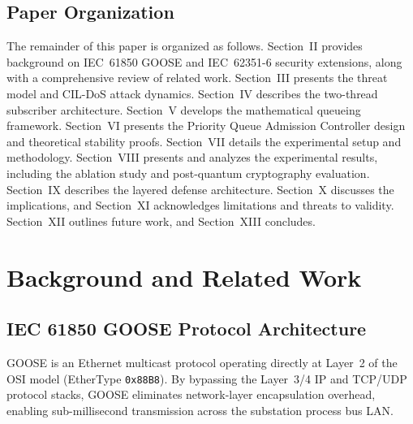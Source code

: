 \documentclass{ieeeaccess}
\begin{document}
\subsection{Paper Organization}
The remainder of this paper is organized as follows. Section~II provides background on IEC~61850 GOOSE and IEC~62351-6 security extensions, along with a comprehensive review of related work. Section~III presents the threat model and CIL-DoS attack dynamics. Section~IV describes the two-thread subscriber architecture. Section~V develops the mathematical queueing framework. Section~VI presents the Priority Queue Admission Controller design and theoretical stability proofs. Section~VII details the experimental setup and methodology. Section~VIII presents and analyzes the experimental results, including the ablation study and post-quantum cryptography evaluation. Section~IX describes the layered defense architecture. Section~X discusses the implications, and Section~XI acknowledges limitations and threats to validity. Section~XII outlines future work, and Section~XIII concludes.

\section{Background and Related Work}

\subsection{IEC 61850 GOOSE Protocol Architecture}
GOOSE is an Ethernet multicast protocol operating directly at Layer~2 of the OSI model (EtherType \texttt{0x88B8}). By bypassing the Layer~3/4 IP and TCP/UDP protocol stacks, GOOSE eliminates network-layer encapsulation overhead, enabling sub-millisecond transmission across the substation process bus LAN.
\end{document}
